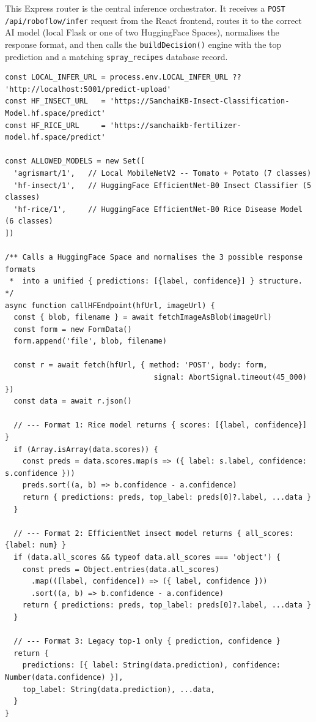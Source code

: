 \documentclass[12pt,a4paper]{report}
\begin{document}
This Express router is the central inference orchestrator. It receives a \texttt{POST /api/roboflow/infer} request from the React frontend, routes it to the correct AI model (local Flask or one of two HuggingFace Spaces), normalises the response format, and then calls the \texttt{buildDecision()} engine with the top prediction and a matching \texttt{spray\_recipes} database record.

\begin{lstlisting}[style=typescript, caption={Model registry and HuggingFace response normaliser (api/routes/roboflow.ts)}]
const LOCAL_INFER_URL = process.env.LOCAL_INFER_URL ?? 'http://localhost:5001/predict-upload'
const HF_INSECT_URL   = 'https://SanchaiKB-Insect-Classification-Model.hf.space/predict'
const HF_RICE_URL     = 'https://sanchaikb-fertilizer-model.hf.space/predict'

const ALLOWED_MODELS = new Set([
  'agrismart/1',   // Local MobileNetV2 -- Tomato + Potato (7 classes)
  'hf-insect/1',   // HuggingFace EfficientNet-B0 Insect Classifier (5 classes)
  'hf-rice/1',     // HuggingFace EfficientNet-B0 Rice Disease Model (6 classes)
])

/** Calls a HuggingFace Space and normalises the 3 possible response formats
 *  into a unified { predictions: [{label, confidence}] } structure. */
async function callHFEndpoint(hfUrl, imageUrl) {
  const { blob, filename } = await fetchImageAsBlob(imageUrl)
  const form = new FormData()
  form.append('file', blob, filename)

  const r = await fetch(hfUrl, { method: 'POST', body: form,
                                  signal: AbortSignal.timeout(45_000) })
  const data = await r.json()

  // --- Format 1: Rice model returns { scores: [{label, confidence}] }
  if (Array.isArray(data.scores)) {
    const preds = data.scores.map(s => ({ label: s.label, confidence: s.confidence }))
    preds.sort((a, b) => b.confidence - a.confidence)
    return { predictions: preds, top_label: preds[0]?.label, ...data }
  }

  // --- Format 2: EfficientNet insect model returns { all_scores: {label: num} }
  if (data.all_scores && typeof data.all_scores === 'object') {
    const preds = Object.entries(data.all_scores)
      .map(([label, confidence]) => ({ label, confidence }))
      .sort((a, b) => b.confidence - a.confidence)
    return { predictions: preds, top_label: preds[0]?.label, ...data }
  }

  // --- Format 3: Legacy top-1 only { prediction, confidence }
  return {
    predictions: [{ label: String(data.prediction), confidence: Number(data.confidence) }],
    top_label: String(data.prediction), ...data,
  }
}
\end{lstlisting}
\end{document}
